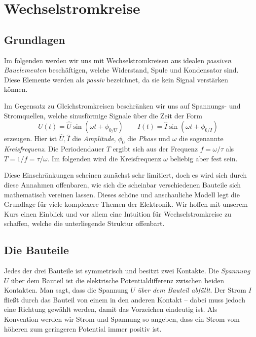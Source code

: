 \section{Wechselstromkreise}
\subsection{Grundlagen}
Im folgenden werden wir uns mit Wechselstromkreisen aus idealen \emph{passiven Bauelementen} beschäftigen, welche Widerstand, Spule und Kondensator sind. Diese Elemente werden als \emph{passiv} bezeichnet, da sie kein Signal verstärken können.

Im Gegensatz zu Gleichstromkreisen beschränken wir uns auf Spannungs- und Stromquellen, welche sinusförmige Signale über die Zeit der Form
\begin{equation}\label{eq:sinusform}
    U(t) = \hat U\sin(\omega t + \phi_{0/U}) \qquad
    I(t) = \hat I\sin(\omega t + \phi_{0/I})
\end{equation}
erzeugen. Hier ist $\hat U, \hat I$ die \emph{Amplitude}, $\phi_0$ die \emph{Phase} und  $\omega$ die sogenannte \emph{Kreisfrequenz}. Die Periodendauer $T$ ergibt sich aus der Frequenz $f = \omega/\tau$ als $T = 1/f = \tau/\omega$.
Im folgenden wird die Kreisfrequenz $\omega$ beliebig aber fest sein.

Diese Einschränkungen scheinen zunächst sehr limitiert, doch es wird sich durch diese Annahmen offenbaren, wie sich die scheinbar verschiedenen Bauteile sich mathematisch vereinen lassen. Dieses schöne und anschauliche Modell legt die Grundlage für viele komplexere Themen der Elektronik. Wir hoffen mit unserem Kurs einen Einblick und vor allem eine Intuition für Wechselstromkreise zu schaffen, welche die unterliegende Struktur offenbart.

\subsection{Die Bauteile}
Jedes der drei Bauteile ist symmetrisch und besitzt zwei Kontakte. Die \emph{Spannung} $U$ über dem Bauteil ist die elektrische Potentialdifferenz zwischen beiden Kontakten. Man sagt, dass die Spannung $U$ \emph{über dem Bauteil abfällt}. Der Strom $I$ fließt durch das Bauteil von einem in den anderen Kontakt -- dabei muss jedoch eine Richtung gewählt werden, damit das Vorzeichen eindeutig ist. Als Konvention werden wir Strom und Spannung so angeben, dass ein Strom vom höheren zum geringeren Potential immer positiv ist.

